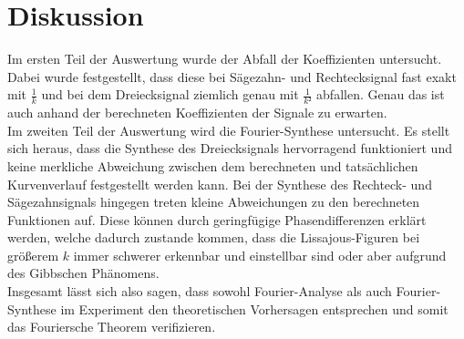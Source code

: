 \section{Diskussion}
\label{sec:Diskussion}

Im ersten Teil der Auswertung wurde der Abfall der Koeffizienten untersucht. 
Dabei wurde festgestellt, dass diese bei Sägezahn- und Rechtecksignal fast 
exakt mit $\frac{1}{k}$ und bei dem Dreiecksignal ziemlich genau mit $\frac{1}{k²}$
abfallen. Genau das ist auch anhand der berechneten Koeffizienten der Signale 
zu erwarten. 
\\
Im zweiten Teil der Auswertung wird die Fourier-Synthese untersucht. Es stellt 
sich heraus, dass die Synthese des Dreiecksignals hervorragend funktioniert und 
keine merkliche Abweichung zwischen dem berechneten und tatsächlichen Kurvenverlauf
festgestellt werden kann. Bei der Synthese des Rechteck- und Sägezahnsignals 
hingegen treten kleine Abweichungen zu den berechneten Funktionen auf. Diese 
können durch geringfügige Phasendifferenzen erklärt werden, welche dadurch zustande
kommen, dass die Lissajous-Figuren bei größerem $k$ immer schwerer erkennbar und 
einstellbar sind oder aber aufgrund des Gibbschen Phänomens. 
\\
Insgesamt lässt sich also sagen, dass sowohl Fourier-Analyse als auch Fourier-Synthese
im Experiment den theoretischen Vorhersagen entsprechen und somit das 
Fouriersche Theorem verifizieren. 